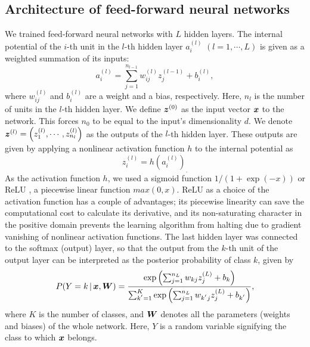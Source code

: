 \subsection{Architecture of feed-forward neural networks}
We trained feed-forward neural networks with $L$ hidden layers.
The internal potential of the $i$-th unit in the $l$-th hidden layer $a^{(l)}_i$ $(l = 1, \cdots, L)$ is given as a weighted summation of its inputs:
\begin{equation}
 a^{(l)}_i = \sum_{j=1}^{n_{l-1}} w^{(l)}_{ij} z^{(l-1)}_j + b^{(l)}_i,
\end{equation}
where $w^{(l)}_{ij}$ and $b^{(l)}_i$ are a weight and a bias, respectively.
%
Here, $n_l$ is the number of units in the $l$-th hidden layer.
%
We define $\mbox{\boldmath $z$}^{(0)}$ as the input vector $\mbox{\boldmath $x$}$ to the network.
%
This forces $n_0$ to be equal to the input's dimensionality $d$.
We denote $\mbox{\boldmath $z$}^{(l)} = \left(z^{(l)}_1, \cdots, z^{(l)}_{n_l}\right)$ as the outputs of the $l$-th hidden layer.
%
These outputs are given by applying a nonlinear activation function $h$ to the internal potential as
\begin{equation}
 z^{(l)}_i = h(a^{(l)}_i)_{.}
\end{equation}
As the activation function $h$, we used a sigmoid function $1 /
\left(1 +  \exp(-x) \right)$ or ReLU \cite{jarrett2009best}, a piecewise
linear function $max(0, x)$.
ReLU as a choice of the activation function has a couple of advantages; its piecewise linearity can save the computational cost to calculate its derivative, and its non-saturating character in the positive domain prevents the learning algorithm from halting due to gradient vanishing of nonlinear activation functions.
The last hidden layer was connected to the softmax (output) layer, so that the output from the $k$-th unit of the output layer can be interpreted as the posterior probability of class $k$, given by
\begin{equation}
 P(Y = k \,|\, \mbox{\boldmath $x$}, \mbox{\boldmath $W$})
=
\frac{\exp\left(\sum_{j=1}^{n_L}w_{kj} z^{(L)}_j + b_k\right)}
{\sum_{k^{'}=1}^{K}\exp\left(\sum_{j=1}^{n_L}w_{k^{'}j} z^{(L)}_j + b_{k^{'}}\right)},
\end{equation}
%
where $K$ is the number of classes, and $\mbox{\boldmath $W$}$ denotes all the parameters (weights and biases) of the whole network.
%
Here, $Y$ is a random variable signifying the class to which $\mbox{\boldmath $x$}$ belongs.

